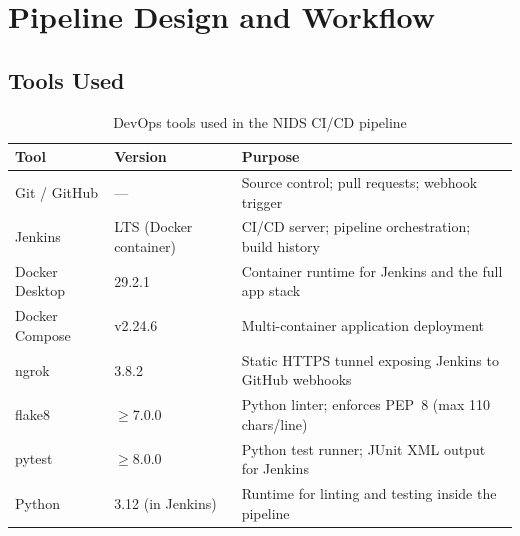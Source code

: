 \documentclass[12pt,a4paper]{report}
\begin{document}
\chapter{Pipeline Design and Workflow}

\section{Tools Used}
\begin{table}[H]
  \centering
  \caption{DevOps tools used in the NIDS CI/CD pipeline}
  \label{tab:tools}
  \begin{tabular}{llp{6cm}}
    \toprule
    \textbf{Tool}         & \textbf{Version}       & \textbf{Purpose} \\
    \midrule
    Git / GitHub          & ---                    & Source control; pull requests;
      webhook trigger \\
    Jenkins               & LTS (Docker container) & CI/CD server; pipeline
      orchestration; build history \\
    Docker Desktop        & 29.2.1                 & Container runtime for
      Jenkins and the full app stack \\
    Docker Compose        & v2.24.6                & Multi-container application
      deployment \\
    ngrok                 & 3.8.2                  & Static HTTPS tunnel exposing
      Jenkins to GitHub webhooks \\
    flake8                & $\geq$7.0.0            & Python linter; enforces
      PEP~8 (max 110 chars/line) \\
    pytest                & $\geq$8.0.0            & Python test runner; JUnit
      XML output for Jenkins \\
    Python                & 3.12 (in Jenkins)      & Runtime for linting and
      testing inside the pipeline \\
    \bottomrule
  \end{tabular}
\end{table}
\end{document}
